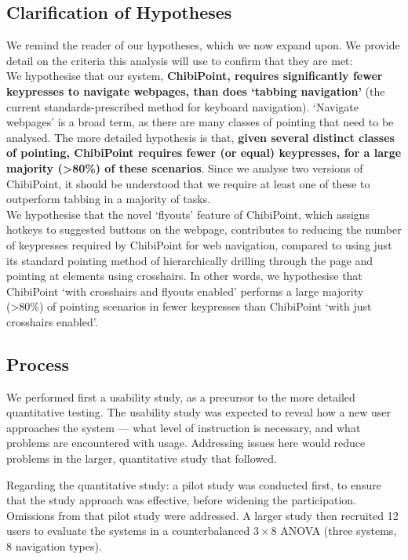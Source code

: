 \documentclass[11pt,openright,a4paper]{report}
\begin{document}
\subsection{Clarification of Hypotheses}
\label{sec:detailedhyp}
We remind the reader of our hypotheses, which we now expand upon. We provide detail on the criteria this analysis will use to confirm that they are met:
\textbf{\hypone}\\
We hypothesise that our system, \textbf{ChibiPoint, requires significantly fewer keypresses to navigate webpages, than does `tabbing navigation'} (the current standards-prescribed method for keyboard navigation).
`Navigate webpages' is a broad term, as there are many classes of pointing that need to be analysed. The more detailed hypothesis is that, \textbf{given several distinct classes of pointing, ChibiPoint requires fewer (or equal) keypresses, for a large majority (>80\%) of these scenarios}. Since we analyse two versions of ChibiPoint, it should be understood that we require at least one of these to outperform tabbing in a majority of tasks.
\textbf{\hyptwo}\\
We hypothesise that the novel `flyouts' feature of ChibiPoint, which assigns hotkeys to suggested buttons on the webpage, contributes to reducing the number of keypresses required by ChibiPoint for web navigation, compared to using just its standard pointing method of hierarchically drilling through the page and pointing at elements using crosshairs.
In other words, we hypothesise that ChibiPoint `with crosshairs and flyouts enabled' performs a large majority (>80\%) of pointing scenarios in fewer keypresses than ChibiPoint `with just crosshairs enabled'.

\subsection{Process}
We performed first a usability study, as a precursor to the more detailed quantitative testing. The usability study was expected to reveal how a new user approaches the system --- what level of instruction is necessary, and what problems are encountered with usage. Addressing issues here would reduce problems in the larger, quantitative study that followed.

Regarding the quantitative study: a pilot study was conducted first, to ensure that the study approach was effective, before widening the participation. Omissions from that pilot study were addressed.
A larger study then recruited 12 users to evaluate the systems in a counterbalanced $3 \times 8$ ANOVA (three systems, 8 navigation types).
\end{document}
